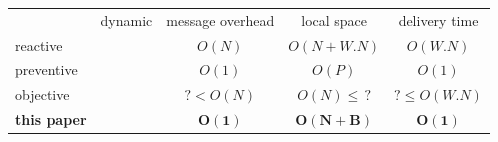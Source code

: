 \newcommand{\cmark}{\ding{51}}%
\newcommand{\xmark}{\ding{55}}%

\setlength{\tabcolsep}{3pt} %

\begin{tabularx}{0.98\columnwidth}{@{}Xcccc@{}}
  & dynamic & message overhead & local space &  delivery time \\ \cmidrule{2-5}
  reactive~\cite{schwarz1994detecting} & \cmark & $O(N)$ & $O(N+W.N)$ & $O(W.N)$ \\
  preventive~\cite{friedman2004causal} & \xmark & $O(1)$ & $O(P)$ & $O(1)$ \\ %
  objective & \cmark & $?<O(N)$ & $O(N)\leq \, ?$ & $? \leq O(W.N)$ \\ \hline\hline
  \textbf{this paper} & \textbf{\cmark} & $\mathbf{O(1)}$ & $\mathbf{O(N+B)}$ & $\mathbf{O(1)}$ \\ 
\end{tabularx}

